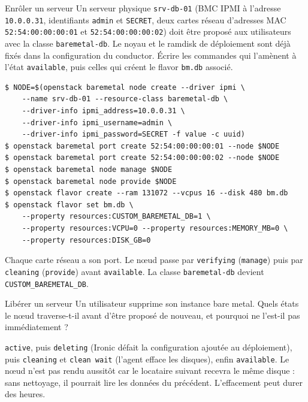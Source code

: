 \begin{exercice}{Enrôler un serveur}\label{ex:ir-enrol}
Un serveur physique \texttt{srv-db-01} (BMC IPMI à l'adresse \texttt{10.0.0.31}, identifiants \texttt{admin} et \texttt{SECRET},
deux cartes réseau d'adresses MAC \texttt{52:54:00:00:00:01} et \texttt{52:54:00:00:00:02}) doit être proposé aux utilisateurs
avec la classe \texttt{baremetal-db}. Le noyau et le ramdisk de déploiement sont déjà fixés dans la configuration du
conductor. Écrire les commandes qui l'amènent à l'état \texttt{available}, puis celles qui créent le flavor \texttt{bm.db}
associé.
\end{exercice}
\begin{correction}
\begin{lstlisting}
$ NODE=$(openstack baremetal node create --driver ipmi \
    --name srv-db-01 --resource-class baremetal-db \
    --driver-info ipmi_address=10.0.0.31 \
    --driver-info ipmi_username=admin \
    --driver-info ipmi_password=SECRET -f value -c uuid)
$ openstack baremetal port create 52:54:00:00:00:01 --node $NODE
$ openstack baremetal port create 52:54:00:00:00:02 --node $NODE
$ openstack baremetal node manage $NODE
$ openstack baremetal node provide $NODE
$ openstack flavor create --ram 131072 --vcpus 16 --disk 480 bm.db
$ openstack flavor set bm.db \
    --property resources:CUSTOM_BAREMETAL_DB=1 \
    --property resources:VCPU=0 --property resources:MEMORY_MB=0 \
    --property resources:DISK_GB=0
\end{lstlisting}
Chaque carte réseau a son port. Le nœud passe par \texttt{verifying} (\texttt{manage}) puis par \texttt{cleaning}
(\texttt{provide}) avant \texttt{available}. La classe \texttt{baremetal-db} devient \texttt{CUSTOM\_\allowbreak BAREMETAL\_\allowbreak DB}.
\end{correction}

\begin{exercice}{Libérer un serveur}\label{ex:ir-liberer}
Un utilisateur supprime son instance bare metal. Quels états le nœud traverse-t-il avant d'être proposé de nouveau, et
pourquoi ne l'est-il pas immédiatement ?
\end{exercice}
\begin{correction}
\texttt{active}, puis \texttt{deleting} (Ironic défait la configuration ajoutée au déploiement), puis \texttt{cleaning} et
\texttt{clean wait} (l'agent efface les disques), enfin \texttt{available}. Le nœud n'est pas rendu aussitôt car le locataire
suivant recevra le même disque : sans nettoyage, il pourrait lire les données du précédent. L'effacement peut durer des
heures.
\end{correction}

